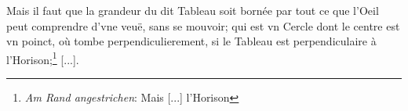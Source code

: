 \pend \pstart [p.~78] Mais il faut que la grandeur du dit Tableau soit born\'{e}e par tout ce que l'Oeil peut comprendre d'vne veuë, sans se mouvoir; qui est vn Cercle dont le centre est vn poinct, o\`{u} tombe perpendiculierement, si le Tableau est perpendiculaire \`{a} l'Horison;\footnote{\textit{Am Rand angestrichen}: Mais [...] l'Horison} [...].